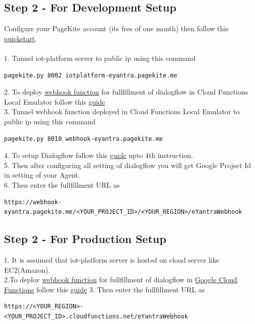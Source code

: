 \documentclass[a4paper,12pt,oneside]{book}
\begin{document}
\subsection*{Step 2 - For Development Setup }
Configure your PageKite account (its free of one month) then follow this \href{https://pagekite.net/support/quickstart/}{quickstart}.\\
\\
1. Tunnel iot-platform server to public ip using this command
\begin{lstlisting}
pagekite.py 8002 iotplatform-eyantra.pagekite.me
\end{lstlisting}
2. To deploy \href{https://github.com/eYSIP-2018/IFTTT-and-NLP/tree/master/eYantraWebhook}{webhook function} for fullfillment of dialogflow in Cloud Functions Local Emulator follow this \href{https://cloud.google.com/functions/docs/emulator}{guide} \\
3. Tunnel webhook function deployed in Cloud Functions Local Emulator to public ip using this command
\begin{lstlisting}
pagekite.py 8010 webhook-eyantra.pagekite.me
\end{lstlisting}
4. To setup Dialogflow follow this \href{https://github.com/eYSIP-2018/IFTTT-and-NLP/wiki/Installation-Guide#setting-up-the-assistant-dialogflow--webhook}{guide} upto 4th instruction.\\
5. Then after configuring all setting of dialogflow you will get Google Project Id in setting of your Agent.\\
6. Then enter the fullfillment URL as
\begin{lstlisting}
https://webhook-eyantra.pagekite.me/<YOUR_PROJECT_ID>/<YOUR_REGION>/eYantraWebhook
\end{lstlisting}
\subsection*{Step 2 - For Production Setup }
1. It is assumed that iot-platform server is hosted on cloud server like EC2(Amazon).\\
2.To deploy \href{https://github.com/eYSIP-2018/IFTTT-and-NLP/tree/master/eYantraWebhook}{webhook function} for fullfillment of dialogflow in \href{https://cloud.google.com/functions/}{Google Cloud Functions} follow this \href{https://cloud.google.com/functions/docs/quickstart-console}{guide}
3. Then enter the fullfillment URL as
\begin{lstlisting}
https://<YOUR_REGION>-<YOUR_PROJECT_ID>.cloudfunctions.net/eYantraWebhook
\end{lstlisting}
\end{document}
